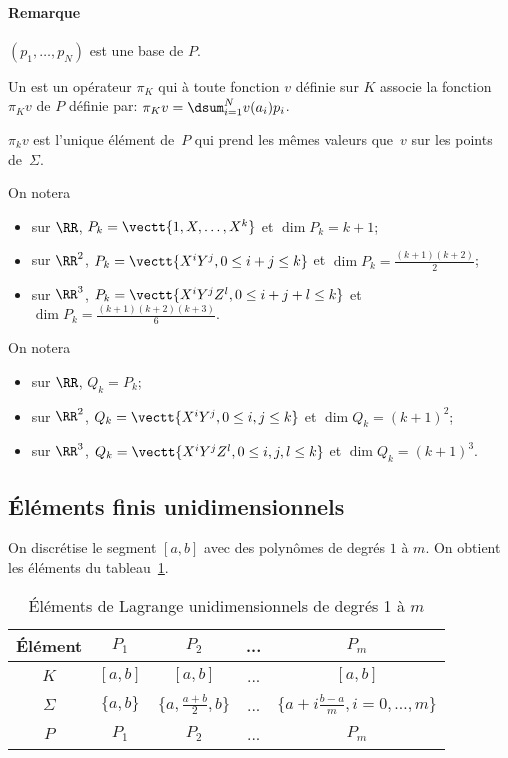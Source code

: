 \paragraph{Remarque} $(p_1,\ldots, p_N)$ est une base de $P$.
\medskip
\begin{definition}
Un  est un opérateur $\pi_K$
qui à toute fonction $v$ définie sur $K$ associe la fonction $\pi_Kv$ de $P$ définie par:
$\pi_Kv=\dsum_{i=1}^N v(a_i)p_i$.
\end{definition}
\begin{theoreme}
$\pi_kv$ est l'unique élément de~$P$ qui prend les mêmes valeurs que~$v$ sur les
points de~$\Sigma$.
\end{theoreme}
\medskip
On notera 
\begin{itemize}
\item sur $\RR$, $P_k=\vectt\{1, X,\ldots, X^k\}$ et $\dim P_k=k+1$;
\item sur $\RR^2$, $P_k=\vectt\{X^iY^j, 0\le i+j\le k\}$ et $\dim P_k=\frac{(k+1)(k+2)}2$;
\item sur $\RR^3$, $P_k=\vectt\{X^iY^jZ^l, 0\le i+j+l\le k\}$ et $\dim P_k=\frac{(k+1)(k+2)(k+3)}6$.
\end{itemize}
\medskip
On notera 
\begin{itemize}
\item sur $\RR$, $Q_k=P_k$;
\item sur $\RR^2$, $Q_k=\vectt\{X^iY^j, 0\le i,j\le k\}$ et $\dim Q_k=(k+1)^2$;
\item sur $\RR^3$, $Q_k=\vectt\{X^iY^jZ^l, 0\le i,j,l\le k\}$ et $\dim Q_k=(k+1)^3$.
\end{itemize}



\medskip
\subsection*{Éléments finis unidimensionnels}
On discrétise le segment $[a,b]$ avec des polynômes de degrés $1$ à $m$.
On obtient les éléments du tableau~\ref{tab:Elem:uni}.
\begin{table}[ht]\centering\small
\begin{tabular}{c|cccc}
Élément & $P_1$ & $P_2$ & ... & $P_m$\\
\hline
$K$	   & $[a,b]$ & $[a,b]$ & ... & $[a,b]$\\
$\Sigma$  & $\{a,b\}$ & $\{a,\frac{a+b}2, b\}$& ... &$\{a+i\frac{b-a}m, i=0,\ldots, m\}$\\
$P$      & $P_1$ & $P_2$ & ... & $P_m$\\
\hline
\end{tabular}
\caption{Éléments de Lagrange unidimensionnels de degrés 1 à $m$}\label{tab:Elem:uni}
\end{table}


